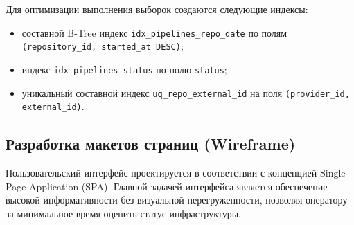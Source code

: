 \begin{table}[H]
    \centering
    \caption{Спецификация таблицы стадий выполнения (\texttt{pipeline\_steps})}
    \label{tab:table_steps}
    \small
\end{table}

Для оптимизации выполнения выборок создаются следующие индексы:
\begin{itemize}
    \item составной B-Tree индекс \texttt{idx\_pipelines\_repo\_date} по полям \texttt{(repository\_id, started\_at DESC)};
    \item индекс \texttt{idx\_pipelines\_status} по полю \texttt{status};
    \item уникальный составной индекс \texttt{uq\_repo\_external\_id} на поля \texttt{(provider\_id, external\_id)}.
\end{itemize}

\subsection{Разработка макетов страниц (Wireframe)}

Пользовательский интерфейс проектируется в соответствии с концепцией Single Page Application (SPA). Главной задачей интерфейса является обеспечение высокой информативности без визуальной перегруженности, позволяя оператору за минимальное время оценить статус инфраструктуры.

